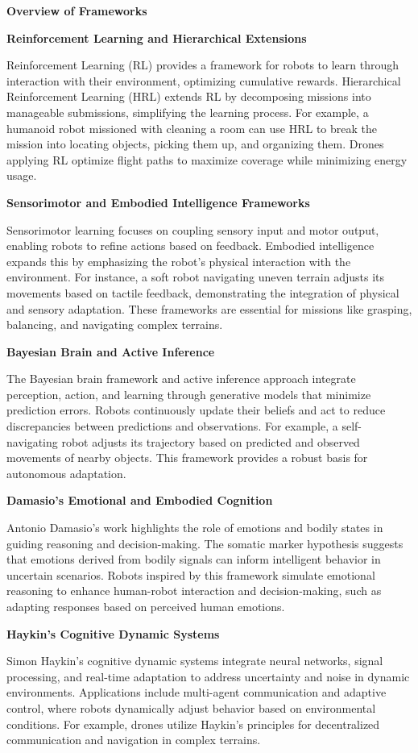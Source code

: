 \documentclass{book}
\providecommand{\ProjectDeepHeading}[2]{%
    \par\medskip\noindent\textbf{#2}\par\smallskip
}
\begin{document}
\ProjectDeepHeading{3}{Overview of Frameworks}
    \ProjectDeepHeading{4}{Reinforcement Learning and Hierarchical Extensions}
    Reinforcement Learning (RL) provides a framework for robots to learn through interaction with their environment, optimizing cumulative rewards. Hierarchical Reinforcement Learning (HRL) extends RL by decomposing missions into manageable submissions, simplifying the learning process. For example, a humanoid robot missioned with cleaning a room can use HRL to break the mission into locating objects, picking them up, and organizing them. Drones applying RL optimize flight paths to maximize coverage while minimizing energy usage.

    \ProjectDeepHeading{4}{Sensorimotor and Embodied Intelligence Frameworks}
    Sensorimotor learning focuses on coupling sensory input and motor output, enabling robots to refine actions based on feedback. Embodied intelligence expands this by emphasizing the robot's physical interaction with the environment. For instance, a soft robot navigating uneven terrain adjusts its movements based on tactile feedback, demonstrating the integration of physical and sensory adaptation. These frameworks are essential for missions like grasping, balancing, and navigating complex terrains.


    \ProjectDeepHeading{4}{Bayesian Brain and Active Inference}
    The Bayesian brain framework and active inference approach integrate perception, action, and learning through generative models that minimize prediction errors. Robots continuously update their beliefs and act to reduce discrepancies between predictions and observations. For example, a self-navigating robot adjusts its trajectory based on predicted and observed movements of nearby objects. This framework provides a robust basis for autonomous adaptation. 

    \ProjectDeepHeading{4}{Damasio’s Emotional and Embodied Cognition}
    Antonio Damasio's work highlights the role of emotions and bodily states in guiding reasoning and decision-making. The somatic marker hypothesis suggests that emotions derived from bodily signals can inform intelligent behavior in uncertain scenarios. Robots inspired by this framework simulate emotional reasoning to enhance human-robot interaction and decision-making, such as adapting responses based on perceived human emotions. 

    \ProjectDeepHeading{4}{Haykin’s Cognitive Dynamic Systems}
    Simon Haykin’s cognitive dynamic systems integrate neural networks, signal processing, and real-time adaptation to address uncertainty and noise in dynamic environments. Applications include multi-agent communication and adaptive control, where robots dynamically adjust behavior based on environmental conditions. For example, drones utilize Haykin’s principles for decentralized communication and navigation in complex terrains. 
\end{document}
